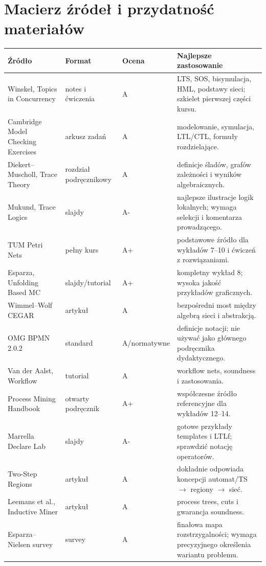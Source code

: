 \documentclass[11pt,a4paper]{article}
\begin{document}
\section{Macierz źródeł i przydatność materiałów}

{\footnotesize
\begin{longtable}{@{}p{35mm}p{26mm}p{18mm}p{71mm}@{}}
\toprule
\textbf{Źródło} & \textbf{Format} & \textbf{Ocena} & \textbf{Najlepsze zastosowanie}\\
\midrule
Winskel, Topics in Concurrency & notes i ćwiczenia & A & LTS, SOS, bisymulacja, HML, podstawy sieci; szkielet pierwszej części kursu.\\
Cambridge Model Checking Exercises & arkusz zadań & A & modelowanie, symulacja, LTL/CTL, formuły rozdzielające.\\
Diekert--Muscholl, Trace Theory & rozdział podręcznikowy & A & definicje śladów, grafów zależności i wyników algebraicznych.\\
Mukund, Trace Logics & slajdy & A- & najlepsze ilustracje logik lokalnych; wymaga selekcji i komentarza prowadzącego.\\
TUM Petri Nets & pełny kurs & A+ & podstawowe źródło dla wykładów 7--10 i ćwiczeń z rozwiązaniami.\\
Esparza, Unfolding Based MC & slajdy/tutorial & A+ & kompletny wykład 8; wysoka jakość przykładów graficznych.\\
Wimmel--Wolf CEGAR & artykuł & A & bezpośredni most między algebrą sieci i abstrakcją.\\
OMG BPMN 2.0.2 & standard & A/normatywne & definicje notacji; nie używać jako głównego podręcznika dydaktycznego.\\
Van der Aalst, Workflow & tutorial & A & workflow nets, soundness i zastosowania.\\
Process Mining Handbook & otwarty podręcznik & A+ & współczesne źródło referencyjne dla wykładów 12--14.\\
Marrella Declare Lab & slajdy & A- & gotowe przykłady templates i LTLf; sprawdzić notację operatorów.\\
Two-Step Regions & artykuł & A & dokładnie odpowiada koncepcji automat/TS $\to$ regiony $\to$ sieć.\\
Leemans et al., Inductive Miner & artykuł & A & process trees, cuts i gwarancja soundness.\\
Esparza--Nielsen survey & survey & A & finałowa mapa rozstrzygalności; wymaga precyzyjnego określenia wariantu problemu.\\
\bottomrule
\end{longtable}
}
\end{document}
